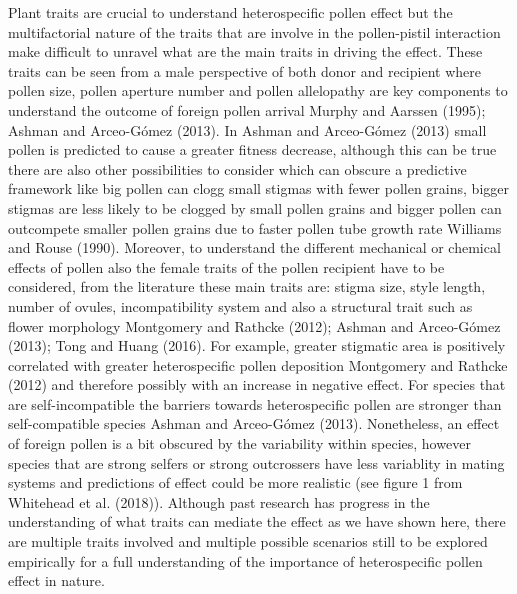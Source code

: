 \documentclass[11pt,a4paper]{article}
\begin{document}
Plant traits are crucial to understand heterospecific pollen effect but
the multifactorial nature of the traits that are involve in the
pollen-pistil interaction make difficult to unravel what are the main
traits in driving the effect. These traits can be seen from a male
perspective of both donor and recipient where pollen size, pollen
aperture number and pollen allelopathy are key components to understand
the outcome of foreign pollen arrival Murphy and Aarssen (1995); Ashman
and Arceo-Gómez (2013). In Ashman and Arceo-Gómez (2013) small pollen is
predicted to cause a greater fitness decrease, although this can be true
there are also other possibilities to consider which can obscure a
predictive framework like big pollen can clogg small stigmas with fewer
pollen grains, bigger stigmas are less likely to be clogged by small
pollen grains and bigger pollen can outcompete smaller pollen grains due
to faster pollen tube growth rate Williams and Rouse (1990). Moreover,
to understand the different mechanical or chemical effects of pollen
also the female traits of the pollen recipient have to be considered,
from the literature these main traits are: stigma size, style length,
number of ovules, incompatibility system and also a structural trait
such as flower morphology Montgomery and Rathcke (2012); Ashman and
Arceo-Gómez (2013); Tong and Huang (2016). For example, greater
stigmatic area is positively correlated with greater heterospecific
pollen deposition Montgomery and Rathcke (2012) and therefore possibly
with an increase in negative effect. For species that are
self-incompatible the barriers towards heterospecific pollen are
stronger than self-compatible species Ashman and Arceo-Gómez (2013).
Nonetheless, an effect of foreign pollen is a bit obscured by the
variability within species, however species that are strong selfers or
strong outcrossers have less variablity in mating systems and
predictions of effect could be more realistic (see figure 1 from
Whitehead et al. (2018)). Although past research has progress in the
understanding of what traits can mediate the effect as we have shown
here, there are multiple traits involved and multiple possible scenarios
still to be explored empirically for a full understanding of the
importance of heterospecific pollen effect in nature.
\end{document}
